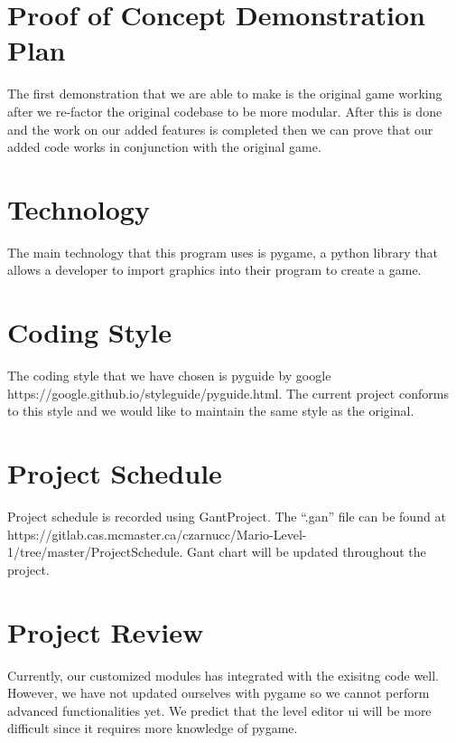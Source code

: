 \documentclass{article}
\begin{document}
\section{Proof of Concept Demonstration Plan}
The first demonstration that we are able to make is the original game working after we re-factor the original codebase to be more modular. After this is done and the work on our added features is completed then we can prove that our added code works in conjunction with the original game.
\section{Technology}
The main technology that this program uses is pygame, a python library that allows a developer to import graphics into their program to create a game.
\section{Coding Style}
The coding style that we have chosen is pyguide by google \\https://google.github.io/styleguide/pyguide.html. The current project conforms to this style and we would like to maintain the same style as the original.
\section{Project Schedule}
Project schedule is recorded using GantProject. The ``.gan'' file can be found at https://gitlab.cas.mcmaster.ca/czarnucc/Mario-Level-1/tree/master/ProjectSchedule. Gant chart will be updated throughout the project.

\section{Project Review}
Currently, our customized modules has integrated with the exisitng code well. However, we have not updated ourselves with pygame so we cannot perform advanced functionalities yet. We predict that the level editor ui will be more difficult since it requires more knowledge of pygame.
\end{document}

